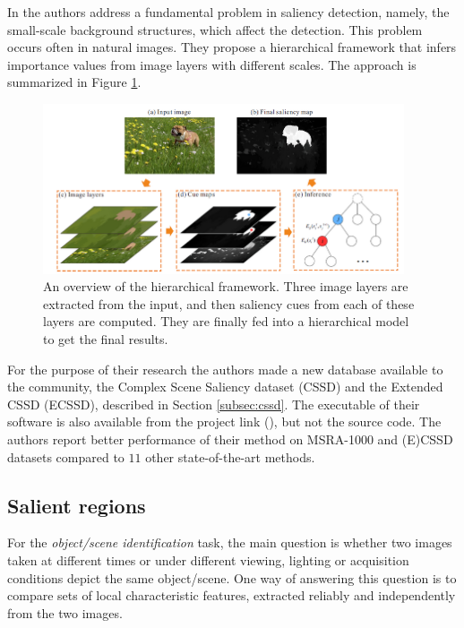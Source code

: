 In \cite{YanCVPR2013} the authors address a fundamental problem in saliency detection, namely, the small-scale background structures, which affect the detection. This problem occurs often in natural images. They propose a hierarchical framework that infers importance values from image layers with different scales. The approach is summarized in Figure \ref{fig:hier_yan13}.

\begin{figure}[H]
\begin{center}
\includegraphics[width=0.95\textwidth]{fig/Hierarchy_Yan13}
\end{center}
\caption{An overview of the hierarchical framework. Three image layers are extracted from the input, and then  saliency cues from each of these layers are computed. They are finally fed into a hierarchical model to get the final results.}
\label{fig:hier_yan13}
\end{figure}

For the purpose of their research the authors made a new database available to the community, the Complex Scene Saliency dataset (CSSD) and the Extended CSSD (ECSSD), described in Section \ref{subsec:cssd}. The executable of their software is also available from the project link (\cite{ecssd_db}), but not the source code. The authors report better performance of their method on MSRA-1000 and (E)CSSD datasets compared to $11$ other state-of-the-art methods.

\subsection{Salient regions}

For the {\em object/scene identification} task, the main question is whether two images taken at different times or under different viewing, lighting or acquisition conditions depict the same object/scene. One way of answering this question is to compare sets of local characteristic features, extracted reliably and independently from the two images.

